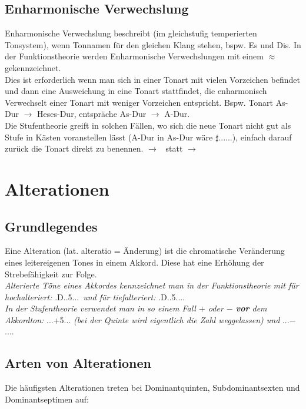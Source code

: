 \documentclass[a4paper]{article}
\newcommand{\dS}[1]{\HH.\uppercase\expandafter{\romannumeral #1\relax}.....} %
\newcommand{\dShoch}[4]{\HH.\uppercase\expandafter{\romannumeral #1\relax}..#2.#3.#4.} %
\newcommand{\Dhoch}[2]{\HH.D.#2.#1...}
\begin{document}
	\subsection{Enharmonische Verwechslung}
	Enharmonische Verwechslung beschreibt (im gleichstufig temperierten Tonsystem), wenn Tonnamen für den gleichen Klang stehen, bspw. Es und Dis. In der Funktionstheorie werden Enharmonische Verwechslungen mit einem $\approx$ gekennzeichnet.\\
	Dies ist erforderlich wenn man sich in einer Tonart mit vielen Vorzeichen befindet und dann eine Ausweichung in eine Tonart stattfindet, die enharmonisch Verwechselt einer Tonart mit weniger Vorzeichen entspricht. Bspw. Tonart As-Dur $\rightarrow$ Heses-Dur, entspräche As-Dur $\rightarrow$ A-Dur.\\
	Die Stufentheorie greift in solchen Fällen, wo sich die neue Tonart nicht gut als Stufe in Kästen voranstellen lässt (A-Dur in As-Dur wäre $\sharp$\dS{1}), einfach darauf zurück die Tonart direkt zu benennen.  $\rightarrow$ \ statt  $\rightarrow$ \Kr{$\sharp$\dS{1}}
	
	\section{Alterationen}
	\subsection{Grundlegendes}
	Eine Alteration (lat. alteratio = Änderung) ist die chromatische Veränderung eines leitereigenen Tones in einem Akkord. Diese hat eine Erhöhung der Strebefähigkeit zur Folge.\\
	\textit{Alterierte Töne eines Akkordes kennzeichnet man in der Funktionstheorie mit \UB für hochalteriert:} \Dhoch{5\UB}{}\ \textit{und \VM für tiefalteriert:} \Dhoch{5\VM}{}.\\
	\textit{In der Stufentheorie verwendet man in so einem Fall $+$ oder $-$ \textbf{vor} dem Akkordton:} \dShoch{5}{+5}{}{} \textit{ (bei der Quinte wird eigentlich die Zahl weggelassen) und }
	\dShoch{5}{$-$}{}{}.
	\subsection{Arten von Alterationen}
	Die häufigsten Alterationen treten bei Dominantquinten, Subdominantsexten und Dominantseptimen auf:
	
\end{document}
